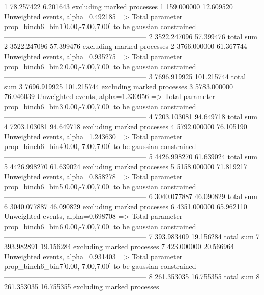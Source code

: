 1          78.257422       6.201643        excluding marked processes    
1          159.000000      12.609520       Unweighted events, alpha=0.492185
  => Total parameter prop_binch6_bin1[0.00,-7.00,7.00] to be gaussian constrained
------------------------------------------------------------
2          3522.247096     57.399476       total sum                     
2          3522.247096     57.399476       excluding marked processes    
2          3766.000000     61.367744       Unweighted events, alpha=0.935275
  => Total parameter prop_binch6_bin2[0.00,-7.00,7.00] to be gaussian constrained
------------------------------------------------------------
3          7696.919925     101.215744      total sum                     
3          7696.919925     101.215744      excluding marked processes    
3          5783.000000     76.046039       Unweighted events, alpha=1.330956
  => Total parameter prop_binch6_bin3[0.00,-7.00,7.00] to be gaussian constrained
------------------------------------------------------------
4          7203.103081     94.649718       total sum                     
4          7203.103081     94.649718       excluding marked processes    
4          5792.000000     76.105190       Unweighted events, alpha=1.243630
  => Total parameter prop_binch6_bin4[0.00,-7.00,7.00] to be gaussian constrained
------------------------------------------------------------
5          4426.998270     61.639024       total sum                     
5          4426.998270     61.639024       excluding marked processes    
5          5158.000000     71.819217       Unweighted events, alpha=0.858278
  => Total parameter prop_binch6_bin5[0.00,-7.00,7.00] to be gaussian constrained
------------------------------------------------------------
6          3040.077887     46.090829       total sum                     
6          3040.077887     46.090829       excluding marked processes    
6          4351.000000     65.962110       Unweighted events, alpha=0.698708
  => Total parameter prop_binch6_bin6[0.00,-7.00,7.00] to be gaussian constrained
------------------------------------------------------------
7          393.983409      19.156284       total sum                     
7          393.982891      19.156284       excluding marked processes    
7          423.000000      20.566964       Unweighted events, alpha=0.931403
  => Total parameter prop_binch6_bin7[0.00,-7.00,7.00] to be gaussian constrained
------------------------------------------------------------
8          261.353035      16.755355       total sum                     
8          261.353035      16.755355       excluding marked processes    
